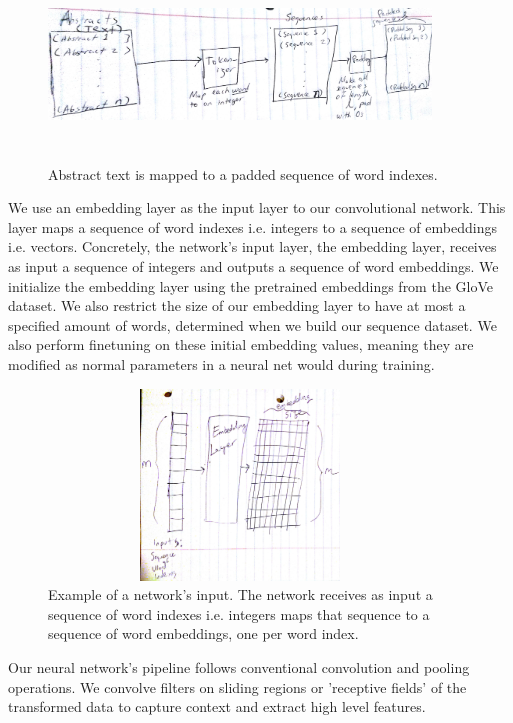 \documentclass[12pt]{article}
\begin{document}
\begin{figure}[H]
\centering
\includegraphics[height=2in, width=4in]{Images/abstracts_to_sequences.jpg}
\caption{Abstract text is mapped to a padded sequence of word indexes.}
\end{figure}




We use an embedding layer as the input layer to our convolutional network. This layer maps a sequence of word indexes i.e. integers
to a sequence of embeddings i.e. vectors.
Concretely, the network's input layer, the embedding layer, receives as input a sequence of integers and outputs a sequence of word embeddings.
We initialize the embedding layer using the pretrained embeddings from the GloVe dataset. We also restrict the size of our embedding
layer to have at most a specified amount of words, determined when we build our sequence dataset. We also perform finetuning on these
initial embedding values, meaning they are modified as normal parameters in a neural net would during training.

\begin{figure}[H]
\centering
\includegraphics[angle=270,origin=c,height=2in, width=4in]{Images/sequences_to_embeddings.jpg}
\caption{Example of a network's input. The network receives as input a sequence of word indexes i.e. integers maps that sequence to a sequence of word embeddings, one per
word index.}
\end{figure}

Our neural network's pipeline follows conventional convolution and pooling operations. We convolve filters on sliding regions or 'receptive fields'
of the transformed data to capture context and extract high level features.
\end{document}
